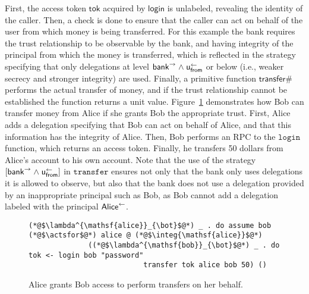 First, the access token $\mathsf{tok}$ acquired by $\mathsf{login}$ is unlabeled, revealing the identity of the caller. Then, a check is done to ensure that the caller can act on behalf of the user from which money is being transferred. For this example the bank requires the trust relationship to be observable by the bank, and having integrity of the principal from which the money is transferred, which is reflected in the strategy specifying that only delegations at level $\mathsf{bank}^{\rightarrow} \mathrel{\land} \mathsf{u}_{\mathsf{from}}^{\leftarrow}$ or below (i.e., weaker secrecy and stronger integrity) are used. Finally, a primitive function $\mathsf{transfer\#}$ performs the actual transfer of money, and if the trust relationship cannot be established the function returns a unit value. Figure~\ref{fig:bob-transfer-from-alice} demonstrates how Bob can transfer money from Alice if she grants Bob the appropriate trust. First, Alice adds a delegation specifying that Bob can act on behalf of Alice, and that this information has the integrity of Alice. Then, Bob performs an RPC to the $\mathtt{login}$ function, which returns an access token. Finally, he transfers 50 dollars from Alice's account to his own account. Note that the use of the strategy $[\mathsf{bank}^{\rightarrow} \mathrel{\land} \mathsf{u}_{\mathsf{from}}^{\leftarrow}]$ in $\mathtt{transfer}$ ensures not only that the bank only uses delegations it is allowed to observe, but also that the bank does not use a delegation provided by an inappropriate principal such as Bob, as Bob cannot add a delegation labeled with the principal $\mathsf{Alice}^{\leftarrow}$.

\begin{figure}
\centering
\begin{lstlisting}
(*@$\lambda^{\mathsf{alice}}_{\bot}$@*) _ . do assume bob (*@$\actsfor$@*) alice @ (*@$\integ{\mathsf{alice}}$@*)
              ((*@$\lambda^{\mathsf{bob}}_{\bot}$@*) _ . do tok <- login bob "password"
                           transfer tok alice bob 50) ()
\end{lstlisting}
\caption{Alice grants Bob access to perform transfers on her behalf.}
\label{fig:bob-transfer-from-alice}
\end{figure}